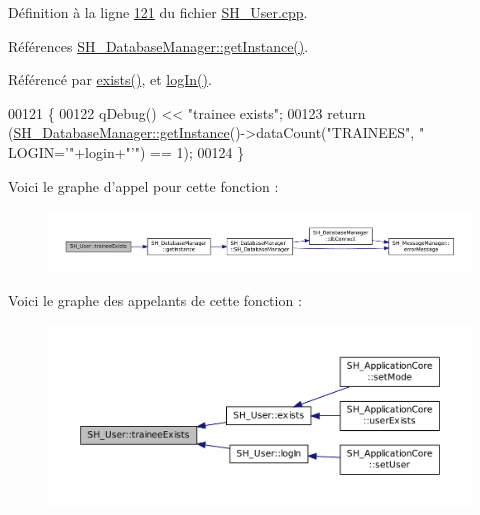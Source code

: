 Définition à la ligne \hyperlink{SH__User_8cpp_source_l00121}{121} du fichier \hyperlink{SH__User_8cpp_source}{S\-H\-\_\-\-User.\-cpp}.



Références \hyperlink{classSH__DatabaseManager_a638369a15265ab0aa053080a32d2ca39}{S\-H\-\_\-\-Database\-Manager\-::get\-Instance()}.



Référencé par \hyperlink{classSH__User_aa83a99478cf6c738f995c5c36345bcd3}{exists()}, et \hyperlink{classSH__User_ad83af309786cb1ed5dbbd2cdca195c30}{log\-In()}.


\begin{DoxyCode}
00121                                          \{
00122     qDebug() << \textcolor{stringliteral}{"trainee exists"};
00123     \textcolor{keywordflow}{return} (\hyperlink{classSH__DatabaseManager_a638369a15265ab0aa053080a32d2ca39}{SH\_DatabaseManager::getInstance}()->dataCount(\textcolor{stringliteral}{"TRAINEES"}, \textcolor{stringliteral}{"
      LOGIN='"}+login+\textcolor{stringliteral}{"'"}) == 1);
00124 \}
\end{DoxyCode}


Voici le graphe d'appel pour cette fonction \-:\nopagebreak
\begin{figure}[H]
\begin{center}
\leavevmode
\includegraphics[width=350pt]{classSH__User_af40edc91cf1a4d8065fb43d2899c3dcb_cgraph}
\end{center}
\end{figure}




Voici le graphe des appelants de cette fonction \-:\nopagebreak
\begin{figure}[H]
\begin{center}
\leavevmode
\includegraphics[width=350pt]{classSH__User_af40edc91cf1a4d8065fb43d2899c3dcb_icgraph}
\end{center}
\end{figure}


